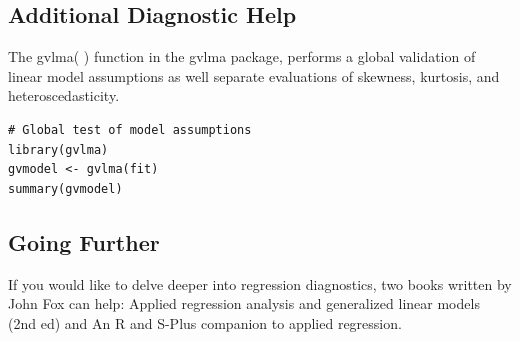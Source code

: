 \documentclass[residuals.tex]{subfiles}
\begin{document}
\subsection{Additional Diagnostic Help}
The gvlma( ) function in the gvlma package, performs a global validation of linear model assumptions as well separate evaluations of skewness, kurtosis, and heteroscedasticity.
\begin{framed}
\begin{verbatim}
# Global test of model assumptions
library(gvlma)
gvmodel <- gvlma(fit) 
summary(gvmodel)
\end{verbatim}
\end{framed}
\subsection{Going Further}
If you would like to delve deeper into regression diagnostics, two books written by John Fox can help: Applied regression analysis and generalized linear models (2nd ed) and An R and S-Plus companion to applied regression.
\end{document}
